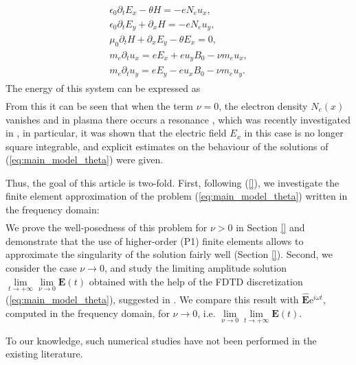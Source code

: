 \begin{align}
\label{eq:main_model_theta}
\begin{split}
\epsilon_0\partial_t E_{x}-\theta H=-eN_e u_x,\nonumber\\
\epsilon_0\partial_t E_{y}+\partial_x H=-eN_e u_y,\nonumber\\
\mu_0\partial_t H+\partial_x E_y-\theta E_x=0,\\
m_e\partial_t u_x=eE_x+eu_yB_0-\nu m_e u_x,\nonumber\\
m_e\partial_t u_y=eE_y-eu_xB_0-\nu m_e u_y.
\end{split}
\end{align}
The energy of this system can be expressed as \cite{}
\begin{align*}

\end{align*}
From this it can be seen that when the term $\nu=0$, the electron density $N_e(x)$ vanishes and in plasma there occurs a resonance \cite{Stix}, 
which was recently investigated in \cite{}, in particular, it was shown that the electric field $E_x$ in this case is no longer square 
integrable, and explicit estimates on the behaviour of the solutions of (\ref{eq:main_model_theta}) were given. 

Thus, the goal of this article is two-fold. 
First, following (\ref{}), we investigate the finite element approximation of the 
problem (\ref{eq:main_model_theta}) written in the frequency domain:
\begin{align*}

\end{align*}
We prove the well-posedness of this problem for $\nu>0$ in Section \ref{} and 
demonstrate that the use of higher-order (P1) finite elements allows to approximate the singularity of the solution fairly well (Section \ref{}). 
Second, we consider the case $\nu\rightarrow 0$, and study the limiting amplitude solution 
$\lim\limits_{t\rightarrow +\infty}\lim\limits_{\nu\rightarrow 0}\mathbf{E}(t)$ obtained with the help of 
the FDTD discretization (\ref{eq:main_model_theta}), suggested in \cite{}. We compare this result with 
$\hat{\mathbf{E}}\mathrm{e}^{i\omega t}$, computed in the frequency domain, for $\nu\rightarrow 0$, i.e.
$\lim\limits_{\nu\rightarrow 0}\lim\limits_{t\rightarrow+\infty}\mathbf{E}(t)$.

To our knowledge, such numerical studies have not been performed in the existing literature. 





